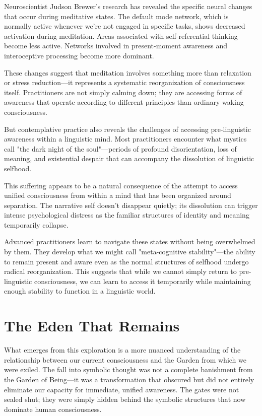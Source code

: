 Neuroscientist Judson Brewer's research has revealed the specific neural changes that occur during meditative states. The default mode network, which is normally active whenever we're not engaged in specific tasks, shows decreased activation during meditation. Areas associated with self-referential thinking become less active. Networks involved in present-moment awareness and interoceptive processing become more dominant.

These changes suggest that meditation involves something more than relaxation or stress reduction—it represents a systematic reorganization of consciousness itself. Practitioners are not simply calming down; they are accessing forms of awareness that operate according to different principles than ordinary waking consciousness.

But contemplative practice also reveals the challenges of accessing pre-linguistic awareness within a linguistic mind. Most practitioners encounter what mystics call "the dark night of the soul"—periods of profound disorientation, loss of meaning, and existential despair that can accompany the dissolution of linguistic selfhood.

This suffering appears to be a natural consequence of the attempt to access unified consciousness from within a mind that has been organized around separation. The narrative self doesn't disappear quietly; its dissolution can trigger intense psychological distress as the familiar structures of identity and meaning temporarily collapse.

Advanced practitioners learn to navigate these states without being overwhelmed by them. They develop what we might call "meta-cognitive stability"—the ability to remain present and aware even as the normal structures of selfhood undergo radical reorganization. This suggests that while we cannot simply return to pre-linguistic consciousness, we can learn to access it temporarily while maintaining enough stability to function in a linguistic world.

\section{The Eden That Remains}

What emerges from this exploration is a more nuanced understanding of the relationship between our current consciousness and the Garden from which we were exiled. The fall into symbolic thought was not a complete banishment from the Garden of Being—it was a transformation that obscured but did not entirely eliminate our capacity for immediate, unified awareness. The gates were not sealed shut; they were simply hidden behind the symbolic structures that now dominate human consciousness.

